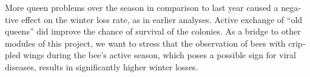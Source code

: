 \begin{otherlanguage}{english}
\newline
More queen problems over the season in comparison to last year caused a negative effect on the winter loss rate, as in earlier analyses. Active exchange of \enquote{old queens} did improve the chance of survival of the colonies.
\newline
As a bridge to other modules of this project, we want to stress that the observation of bees with crippled wings during the bee’s active season, which poses a possible sign for viral diseases, results in significantly higher winter losses. 
\end{otherlanguage}